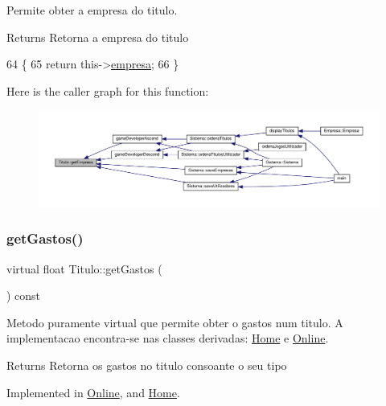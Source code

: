 Permite obter a empresa do titulo. 

\begin{DoxyReturn}{Returns}
Retorna a empresa do titulo 
\end{DoxyReturn}

\begin{DoxyCode}
64                                    \{
65         \textcolor{keywordflow}{return} this->\hyperlink{classTitulo_a91510c440dc8583d60d88ea02f4eb1b6}{empresa};
66 \}
\end{DoxyCode}
Here is the caller graph for this function\+:
\nopagebreak
\begin{figure}[H]
\begin{center}
\leavevmode
\includegraphics[width=350pt]{classTitulo_a48d810fe27da41cfb726fb5680a68471_icgraph}
\end{center}
\end{figure}
\mbox{\label{classTitulo_a9272448eec05cd9c026c54824bf2e727}} 
\subsubsection{\texorpdfstring{get\+Gastos()}{getGastos()}}
{\footnotesize\ttfamily virtual float Titulo\+::get\+Gastos (\begin{DoxyParamCaption}{ }\end{DoxyParamCaption}) const\hspace{0.3cm}{\ttfamily [pure virtual]}}



Metodo puramente virtual que permite obter o gastos num titulo. A implementacao encontra-\/se nas classes derivadas\+: \hyperlink{classHome}{Home} e \hyperlink{classOnline}{Online}. 

\begin{DoxyReturn}{Returns}
Retorna os gastos no titulo consoante o seu tipo 
\end{DoxyReturn}


Implemented in \hyperlink{classOnline_ac3a2197523ee26effcacd9a2a9fe968e}{Online}, and \hyperlink{classHome_aff6d69739d404378524a591596b47856}{Home}.

